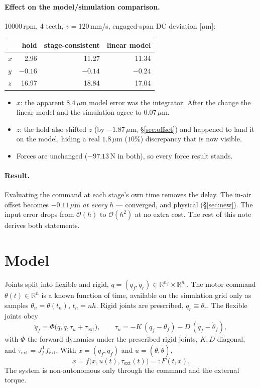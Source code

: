 \documentclass[11pt]{article}
\newcommand{\T}{^{\mathsf T}}
\begin{document}
\paragraph{Effect on the model/simulation comparison.} 10000\,rpm, 4 teeth, $v=120$\,mm/s,
engaged-span DC deviation [$\mu$m]:
\begin{center}
\begin{tabular}{lrrr}
\toprule
 & hold & stage-consistent & linear model \\
\midrule
$x$ & 2.96  & 11.27 & 11.34 \\
$y$ & $-0.16$ & $-0.14$ & $-0.24$ \\
$z$ & 16.97 & 18.84 & 17.04 \\
\bottomrule
\end{tabular}
\end{center}
\begin{itemize}
  \item $x$: the apparent $8.4\,\mu$m model error was the integrator. After the change the linear
        model and the simulation agree to $0.07\,\mu$m.
  \item $z$: the hold also shifted $z$ (by $-1.87\,\mu$m, \S\ref{sec:offset}) and happened to land
        it on the model, hiding a real $1.8\,\mu$m ($10\%$) discrepancy that is now visible.
  \item Forces are unchanged ($-97.13$\,N in both), so every force result stands.
\end{itemize}

\paragraph{Result.} Evaluating the command at each stage's own time removes the delay. The
in-air offset becomes $-0.11\,\mu$m \emph{at every} $h$ --- converged, and physical
(\S\ref{sec:new}). The input error drops from $\mathcal O(h)$ to $\mathcal O(h^2)$ at no extra
cost. The rest of this note derives both statements.

\section{Model}

Joints split into flexible and rigid, $q=(q_f,q_r)\in\mathbb R^{n_f}\times\mathbb R^{n_r}$.
The motor command $\theta(t)\in\mathbb R^{n}$ is a known function of time, available on the
simulation grid only as samples $\theta_n=\theta(t_n)$, $t_n=nh$. Rigid joints are prescribed,
$q_r\equiv\theta_r$. The flexible joints obey
\begin{equation}
  \ddot q_f=\Phi\big(q,\dot q,\tau_u+\tau_{\mathrm{ext}}\big),\qquad
  \tau_u=-K\,(q_f-\theta_f)-D\,(\dot q_f-\dot\theta_f),
  \label{eq:model}
\end{equation}
with $\Phi$ the forward dynamics under the prescribed rigid joints, $K,D$ diagonal, and
$\tau_{\mathrm{ext}}=J_f\T f_{\mathrm{ext}}$. With $x=(q_f,\dot q_f)$ and $u=(\theta,\dot\theta)$,
\begin{equation}
  \dot x=f\big(x,u(t),\tau_{\mathrm{ext}}(t)\big)=:F(t,x).
\end{equation}
The system is non-autonomous only through the command and the external torque.
\end{document}
